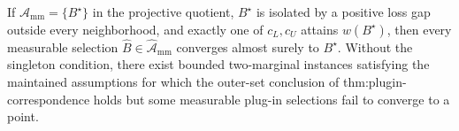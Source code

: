 If \(\mathcal A_{\mathrm{mm}}=\{B^\star\}\) in the projective quotient, \(B^\star\) is isolated by a positive loss gap outside every neighborhood, and exactly one of \(c_L,c_U\) attains \(w(B^\star)\), then every measurable selection \(\widehat B\in\widehat{\mathcal A}_{\mathrm{mm}}\) converges almost surely to \(B^\star\).  Without the singleton condition, there exist bounded two-marginal instances satisfying the maintained assumptions for which the outer-set conclusion of thm:plugin-correspondence holds but some measurable plug-in selections fail to converge to a point.